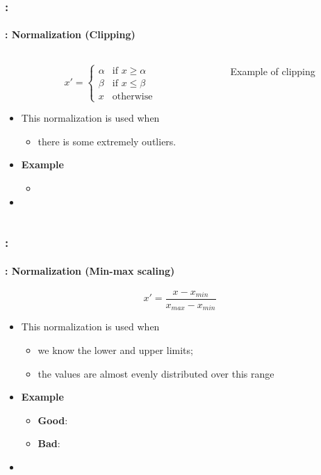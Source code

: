 \documentclass[xcolor=table]{beamer}
\begin{document}
\begin{frame}
	\frametitle{\insertshortsubtitle: \insertsection}
	\framesubtitle{\insertsubsection: Normalization (Clipping)}
	
	\begin{columns}
	\begin{column}{.5\textwidth}
	\[x' = \begin{cases}
	\alpha & \text{if } x \ge \alpha \\
	\beta & \text{if } x \le \beta \\
	x & \text{otherwise}
	\end{cases}
	\]
	
	\begin{itemize}
		\item This normalization is used when
		\begin{itemize}
			\item there is some extremely outliers.
		\end{itemize}
		\item \textbf{Example}
		\begin{itemize}
			\item {}
		\end{itemize}
		\item {}
	\end{itemize}
	\end{column}
	\begin{column}{.5\textwidth}
		
		\begin{center}
			Example of clipping \cite{2021-google-prep}
		\end{center}
	\end{column}
 \end{columns}
	
\end{frame}

\begin{frame}
	\frametitle{\insertshortsubtitle: \insertsection}
	\framesubtitle{\insertsubsection: Normalization (Min-max scaling)}
	
	\[x' = \frac{x - x_{min}}{x_{max} - x_{min}}\]
	
	\begin{itemize}
		\item This normalization is used when
		\begin{itemize}
			\item we know the lower and upper limits;
			\item the values are almost evenly distributed over this range
		\end{itemize}
		\item \textbf{Example}
		\begin{itemize}
			\item \textbf{Good}: 
			\item \textbf{Bad}: 
		\end{itemize}
		\item {}
	\end{itemize}
	
\end{frame}
\end{document}
